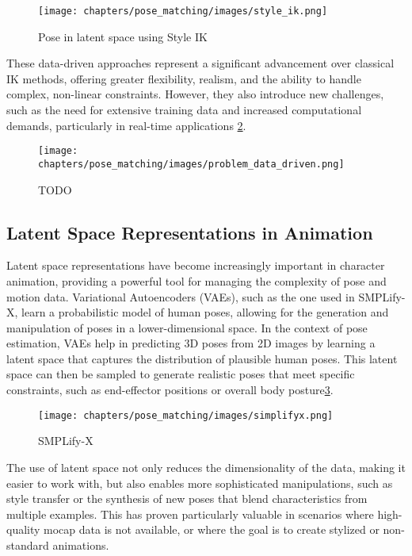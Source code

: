 \documentclass[../../main.tex]{subfiles}
\begin{document}
\begin{figure}
  \centering \texttt{[image: chapters/pose\_matching/images/style\_ik.png]}
  \caption{Pose in latent space using Style IK}
  \label{fig:style_ik}
\end{figure}

These data-driven approaches represent a significant advancement over classical IK methods, offering greater flexibility, realism, and the ability to handle complex, non-linear constraints. However, they also introduce new challenges, such as the need for extensive training data and increased computational demands, particularly in real-time applications \ref{fig:problem_data_driven}.

\begin{figure}
  \centering \texttt{[image: chapters/pose\_matching/images/problem\_data\_driven.png]}
  \caption{TODO}
  \label{fig:problem_data_driven}
\end{figure}

\subsection{Latent Space Representations in Animation}

Latent space representations have become increasingly important in character animation, providing a powerful tool for managing the complexity of pose and motion data. Variational Autoencoders (VAEs)\cite{TODO}, such as the one used in SMPLify-X\cite{TODO}, learn a probabilistic model of human poses, allowing for the generation and manipulation of poses in a lower-dimensional space. In the context of pose estimation, VAEs help in predicting 3D poses from 2D images by learning a latent space that captures the distribution of plausible human poses. This latent space can then be sampled to generate realistic poses that meet specific constraints, such as end-effector positions or overall body posture\ref{fig:simplifyx}.

\begin{figure}
  \centering \texttt{[image: chapters/pose\_matching/images/simplifyx.png]}
  \caption{SMPLify-X}
  \label{fig:simplifyx}
\end{figure}

The use of latent space not only reduces the dimensionality of the data, making it easier to work with, but also enables more sophisticated manipulations, such as style transfer or the synthesis of new poses that blend characteristics from multiple examples. This has proven particularly valuable in scenarios where high-quality mocap data is not available, or where the goal is to create stylized or non-standard animations.
\end{document}
